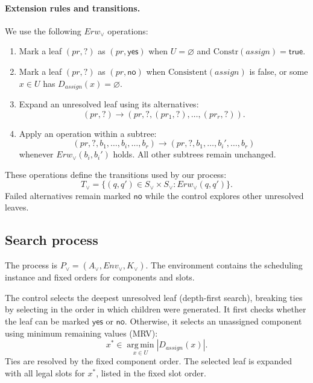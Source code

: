\paragraph{Extension rules and transitions.}
We use the following $\mathit{Erw}_{\lor}$ operations:
\begin{enumerate}
  \item Mark a leaf $(pr,?)$ as $(pr,\mathsf{yes})$ when
  $U=\varnothing$ and
  $\mathrm{Constr}(\mathit{assign})=\mathsf{true}$.

  \item Mark a leaf $(pr,?)$ as $(pr,\mathsf{no})$ when
  $\mathrm{Consistent}(\mathit{assign})$ is false, or
  some $x\in U$ has
  $D_{\mathit{assign}}(x)=\varnothing$.

  \item Expand an unresolved leaf using its alternatives:
  \[
  (pr,?)
  \longrightarrow
  (pr,?,(pr_1,?),\ldots,(pr_r,?)).
  \]

  \item Apply an operation within a subtree:
  \[
  (pr,?,b_1,\ldots,b_i,\ldots,b_r)
  \longrightarrow
  (pr,?,b_1,\ldots,b_i',\ldots,b_r)
  \]
  whenever $\mathit{Erw}_{\lor}(b_i,b_i')$ holds.
  All other subtrees remain unchanged.
\end{enumerate}
These operations define the transitions used by our process:
\[
T_{\lor}
=\{(q,q')\in S_{\lor}\times S_{\lor}:
  \mathit{Erw}_{\lor}(q,q')\}.
\]
Failed alternatives remain marked $\mathsf{no}$ while the
control explores other unresolved leaves.

\subsection{Search process}
\label{sec:or-process}

The process is
$P_{\lor}=(A_{\lor},\mathit{Env}_{\lor},K_{\lor})$.
The environment contains the scheduling instance and fixed
orders for components and slots.

The control selects the deepest unresolved leaf (depth-first search), breaking
ties by selecting in the order in which children were generated. It
first checks whether the leaf can be marked
$\mathsf{yes}$ or $\mathsf{no}$. Otherwise, it selects an
unassigned component using minimum remaining values (MRV):
\[
x^*\in\operatorname*{arg\,min}_{x\in U}
|D_{\mathit{assign}}(x)|.
\]
Ties are resolved by the fixed component order. The selected
leaf is expanded with all legal slots for $x^*$, listed
in the fixed slot order.

